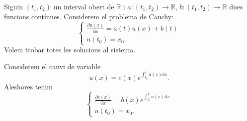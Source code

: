 \documentclass[../Apunts.tex]{subfiles}
\begin{document}
	\begin{example}
		\label{ex:Equacions diferencials lineals}
		Siguin \((t_{1},t_{2})\) un interval obert de \(\mathbb{R}\) i \(a\colon(t_{1},t_{2})\longrightarrow\mathbb{R}\), \(b\colon(t_{1},t_{2})\longrightarrow\mathbb{R}\) dues funcions contínues. Considerem el problema de Cauchy:
		\begin{equation}
			\label{ex:equacions diferencials lineals:eq1}
			\begin{cases}
				\displaystyle \frac{\partial u(x)}{\partial x}=a(t)u(x)+b(t)\\
				\displaystyle u(t_{0})=x_{0}.
			\end{cases}
		\end{equation}
		Volem trobar totes les solucions al sistema.
		\begin{solution}
			Considerem el canvi de variable
			\begin{equation}
				\label{ex:equacions diferencials lineals:eq2}
				u(x)=c(x)e^{\int_{t_{0}}^{x}a(s)\text{d}s}.
			\end{equation}
			Aleshores tenim
			\begin{equation}
				\label{ex:equacions diferencials lineals:eq3}
				\begin{cases}
					\displaystyle \frac{\partial c(x)}{\partial x}=b(x)e^{\int_{t_{0}}^{x}a(s)\text{d}s}\\
					\displaystyle u(t_{0})=x_{0}.
				\end{cases}
			\end{equation}
			
		\end{solution}
	\end{example}
\end{document}
